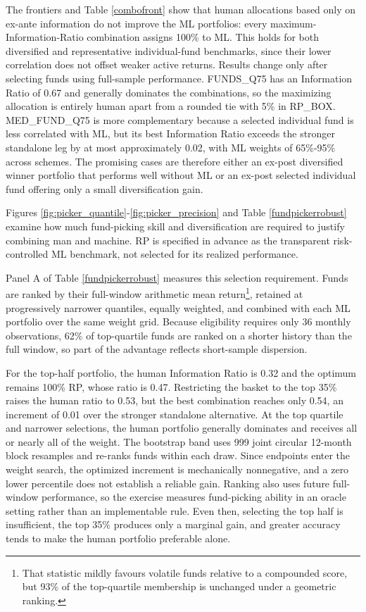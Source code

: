 \documentclass[preprint,12pt,authoryear]{elsarticle}
\begin{document}
The frontiers and Table \ref{combofront} show that human allocations based only on ex-ante information do not improve the ML portfolios: every maximum-Information-Ratio combination assigns 100\% to ML. This holds for both diversified and representative individual-fund benchmarks, since their lower correlation does not offset weaker active returns. Results change only after selecting funds using full-sample performance. FUNDS\_Q75 has an Information Ratio of 0.67 and generally dominates the combinations, so the maximizing allocation is entirely human apart from a rounded tie with 5\% in RP\_BOX. MED\_FUND\_Q75 is more complementary because a selected individual fund is less correlated with ML, but its best Information Ratio exceeds the stronger standalone leg by at most approximately 0.02, with ML weights of 65\%-95\% across schemes. The promising cases are therefore either an ex-post diversified winner portfolio that performs well without ML or an ex-post selected individual fund offering only a small diversification gain.

Figures \ref{fig:picker_quantile}-\ref{fig:picker_precision} and Table \ref{fundpickerrobust} examine how much fund-picking skill and diversification are required to justify combining man and machine. RP is specified in advance as the transparent risk-controlled ML benchmark, not selected for its realized performance.

 Panel A of Table \ref{fundpickerrobust} measures this selection requirement. Funds are ranked by their full-window arithmetic mean return\footnote{That statistic mildly favours volatile funds relative to a compounded score, but 93\% of the top-quartile membership is unchanged under a geometric ranking.}, retained at progressively narrower quantiles, equally weighted, and combined with each ML portfolio over the same weight grid. Because eligibility requires only 36 monthly observations, 62\% of top-quartile funds are ranked on a shorter history than the full window, so part of the advantage reflects short-sample dispersion.
 
 For the top-half portfolio, the human Information Ratio is 0.32 and the optimum remains 100\% RP, whose ratio is 0.47. Restricting the basket to the top 35\% raises the human ratio to 0.53, but the best combination reaches only 0.54, an increment of 0.01 over the stronger standalone alternative. At the top quartile and narrower selections, the human portfolio generally dominates and receives all or nearly all of the weight. The bootstrap band uses 999 joint circular 12-month block resamples and re-ranks funds within each draw. Since endpoints enter the weight search, the optimized increment is mechanically nonnegative, and a zero lower percentile does not establish a reliable gain. Ranking also uses future full-window performance, so the exercise measures fund-picking ability in an oracle setting rather than an implementable rule. Even then, selecting the top half is insufficient, the top 35\% produces only a marginal gain, and greater accuracy tends to make the human portfolio preferable alone.
\end{document}
